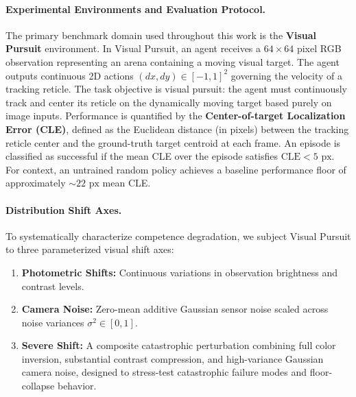 
\paragraph{Experimental Environments and Evaluation Protocol.}
The primary benchmark domain used throughout this work is the \textbf{Visual Pursuit} environment.
In Visual Pursuit, an agent receives a $64\times 64$ pixel RGB observation representing an arena containing a moving visual target.
The agent outputs continuous 2D actions $(dx, dy) \in [-1, 1]^2$ governing the velocity of a tracking reticle.
The task objective is visual pursuit: the agent must continuously track and center its reticle on the dynamically moving target based purely on image inputs.
Performance is quantified by the \textbf{Center-of-target Localization Error (CLE)}, defined as the Euclidean distance (in pixels) between the tracking reticle center and the ground-truth target centroid at each frame.
An episode is classified as successful if the mean CLE over the episode satisfies $\text{CLE} < 5\text{ px}$.
For context, an untrained random policy achieves a baseline performance floor of approximately $\sim 22\text{ px}$ mean CLE.

\paragraph{Distribution Shift Axes.}
To systematically characterize competence degradation, we subject Visual Pursuit to three parameterized visual shift axes:
\begin{enumerate}
    \item \textbf{Photometric Shifts:} Continuous variations in observation brightness and contrast levels.
    \item \textbf{Camera Noise:} Zero-mean additive Gaussian sensor noise scaled across noise variances $\sigma^2 \in [0, 1]$.
    \item \textbf{Severe Shift:} A composite catastrophic perturbation combining full color inversion, substantial contrast compression, and high-variance Gaussian camera noise, designed to stress-test catastrophic failure modes and floor-collapse behavior.
\end{enumerate}

